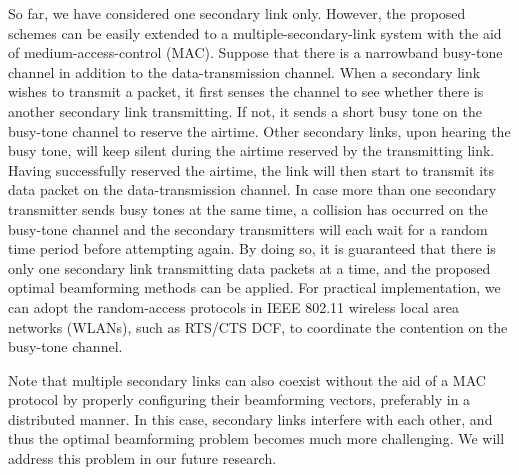 \documentclass[twocolumn,10pt]{IEEEtran}
\theoremstyle{plain} \newtheorem{theorem}{Theorem}
\theoremstyle{plain} \newtheorem{proposition}{Proposition}
\theoremstyle{plain} \newtheorem{corollary}{Corollary}
\theoremstyle{remark} \newtheorem{remark}{Remark}
\theoremstyle{remark} \newtheorem{lemma}{Lemma}
\theoremstyle{plain} \newtheorem{definition}{Definition}
\theoremstyle{plain} \newtheorem{assumption}{Assumption}
\theoremstyle{plain} \newtheorem{fact}{Fact}
\begin{document}
So far, we have considered one secondary link only. However, the proposed schemes can be easily extended to a multiple-secondary-link system with the aid of medium-access-control (MAC). Suppose that there is a narrowband busy-tone channel in addition to the data-transmission channel. When a secondary link wishes to transmit a packet, it first senses the channel to see whether there is another secondary link transmitting. If not, it sends a short busy tone on the busy-tone channel to reserve the airtime. Other secondary links, upon hearing the busy tone, will keep silent during the airtime reserved by the transmitting link. Having successfully reserved the airtime, the link will then start to transmit its data packet on the data-transmission channel. In case more than one secondary transmitter sends busy tones at the same time, a collision has occurred on the busy-tone channel and the secondary transmitters will each wait for a random time period before attempting again. By doing so, it is guaranteed that there is only one secondary link transmitting data packets at a time, and the proposed optimal beamforming methods can be applied. For practical implementation, we can adopt the random-access protocols in IEEE 802.11 wireless local area networks (WLANs), such as RTS/CTS DCF, to coordinate the contention on the busy-tone channel.

Note that multiple secondary links can also coexist without the aid of a MAC protocol by properly configuring their beamforming vectors, preferably in a distributed manner. In this case, secondary links interfere with each other, and thus the optimal beamforming problem becomes much more challenging. We will address this problem in our future research.



\end{document}
